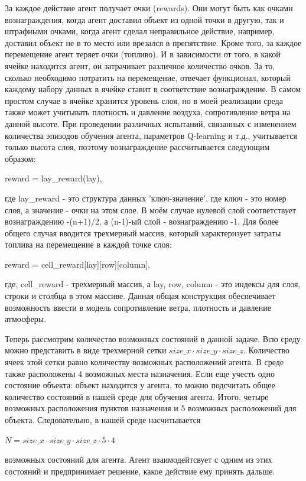 \documentclass[a4paper]{report}
\theoremstyle{definition}
\theoremstyle{plain}
\theoremstyle{remark}
\theoremstyle{remark}
\theoremstyle{definition}
\begin{document}
За каждое действие агент получает очки (rewards). Они могут быть как очками вознаграждения, когда агент доставил объект из одной точки в другую, так и штрафными очками, когда агент сделал неправильное действие, например, доставил объект не в то место или врезался в препятствие. Кроме того, за каждое перемещение агент теряет очки (топливо). И в зависимости от того, в какой ячейке находится агент, он затрачивает различное количество очков. За то, сколько необходимо потратить на перемещение, отвечает функционал, который каждому набору данных в ячейке ставит в соответствие вознаграждение. В самом простом случае в ячейке хранится уровень слоя, но в моей реализации среда также может учитывать плотность и давление воздуха, сопротивление ветра на данной высоте. При проведении различных испытаний, связанных с изменением количества эпизодов обучения агента, параметров Q-learning и т.д., учитывается только высота слоя, поэтому вознаграждение рассчитывается следующим образом:
\begin{center}
    reward = lay\_reward(lay),
\end{center}
где lay\_reward - это структура данных 'ключ-значение', где ключ - это номер слоя, а значение - очки на этом слое. В моём случае нулевой слой соответствует вознаграждению -(n+1)/2, а (n-1)-ый слой - вознаграждению -1. Для более общего случая вводится трехмерный массив, который характеризует затраты топлива на перемещение в каждой точке слоя:
\begin{center}
    reward = cell\_reward[lay][row][column],
\end{center}
где, cell\_reward - трехмерный массив, а lay, row, column - это индексы для слоя, строки и столбца в этом массиве. Данная общая конструкция обеспечивает возможность ввести в модель сопротивление ветра, плотность и давление атмосферы.

Теперь рассмотрим количество возможных состояний в данной задаче. Всю среду можно представить в виде трехмерной сетки $size\_x \cdot size\_y \cdot size\_z$. Количество ячеек этой сетки равно количеству возможных расположений агента. В среде также расположены 4 возможных места назначения. Если еще учесть одно состояние объекта: объект находится у агента, то можно подсчитать общее количество состояний в нашей среде для обучения агента. Итого, четыре возможных расположения пунктов назначения и 5 возможных расположений для объекта. Следовательно, в нашей среде насчитывается 
\begin{center}
    $N = size\_x \cdot size\_y \cdot size\_z \cdot 5 \cdot 4$
\end{center}
возможных состояний для агента. Агент взаимодейтсвует с одним из этих состояний и предпринимает решение, какое действие ему принять дальше.
\end{document}
